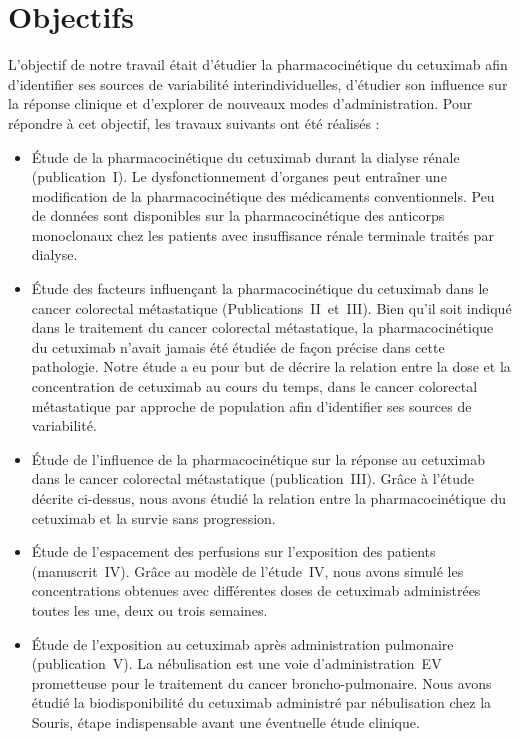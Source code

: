 ﻿\chapter{Objectifs}

L'objectif de notre travail était d'étudier la pharmacocinétique du cetuximab afin d'identifier ses sources de variabilité interindividuelles, d'étudier son influence sur la réponse clinique et d'explorer de nouveaux modes d'administration. Pour répondre à cet objectif, les travaux suivants ont été réalisés :


\begin{itemize}
\item Étude de la pharmacocinétique du cetuximab durant la dialyse rénale (publication~I). Le dysfonctionnement d'organes peut entraîner une modification de la pharmacocinétique des médicaments conventionnels. Peu de données sont disponibles sur la pharmacocinétique des anticorps monoclonaux chez les patients avec insuffisance rénale terminale traités par dialyse.


\item Étude des facteurs influençant la pharmacocinétique du cetuximab dans le cancer colorectal métastatique (Publications~II~et~III). Bien qu'il soit indiqué dans le traitement du cancer colorectal métastatique, la pharmacocinétique du cetuximab n'avait jamais été étudiée de façon précise dans cette pathologie. Notre étude a eu pour but de décrire la relation entre la dose et la concentration de cetuximab au cours du temps, dans le cancer colorectal métastatique par approche de population afin d'identifier ses sources de variabilité.


\item Étude de l'influence de la pharmacocinétique sur la réponse au cetuximab dans le cancer colorectal métastatique (publication~III). Grâce à l'étude décrite ci-dessus, nous avons étudié la relation entre la pharmacocinétique du cetuximab et la survie sans progression.


\item Étude de l'espacement des perfusions sur l'exposition des patients (manuscrit~IV). Grâce au modèle de l'étude~IV, nous avons simulé les concentrations obtenues avec différentes doses de cetuximab administrées toutes les une, deux ou trois semaines.


\item Étude de l'exposition au cetuximab après administration pulmonaire (publication~V). La nébulisation est une voie d'administration~\gls{EV} prometteuse pour le traitement du cancer broncho-pulmonaire. Nous avons étudié la biodisponibilité du cetuximab administré par nébulisation chez la Souris, étape indispensable avant une éventuelle étude clinique.
\end{itemize}

